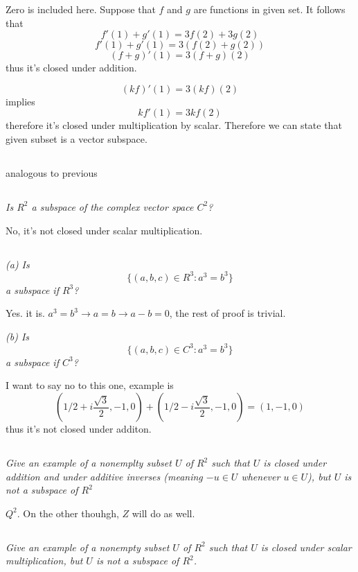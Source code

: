 \documentclass[10pt,oneside,titlepage]{book}
\begin{document}
Zero is included here. Suppose that $f$ and $g$ are functions in given set.
It follows that
$$f'(1) + g'(1) = 3f(2) + 3g(2)$$
$$f'(1) + g'(1) = 3(f(2) + g(2))$$
$$(f + g)'(1) = 3(f + g)(2)$$
thus it's closed under addition.

$$(kf)'(1) = 3(kf)(2)$$
implies
$$kf'(1) = 3kf(2)$$
therefore it's closed under multiplication by scalar.
Therefore we can state that given subset is a vector subspace.

\subsection{}
analogous to previous

\subsection{}
\textit{Is $R^2$ a subspace of the complex vector space $C^2$?}

No, it's not closed under scalar multiplication.

\subsection{}
\textit{(a) Is }
$$\{(a, b, c) \in R^3: a^3 = b^3\}$$
\textit{a subspace if $R^3$?}

Yes. it is. $a^3 = b^3 \to a = b \to a - b = 0$, the rest of proof is trivial.

\textit{(b) Is }
$$\{(a, b, c) \in C^3: a^3 = b^3\}$$
\textit{a subspace if $C^3$?}

I want to say no to this one, example is
$$(1/2 + i\frac{\sqrt{3}}{2}, -1, 0) +
(1/2 - i\frac{\sqrt{3}}{2}, -1, 0) =
(1, -1, 0)$$
thus it's not closed under additon.

\subsection{}
\textit{Give an example of a nonemplty subset $U$ of $R^2$ such that $U$ is
  closed under addition and under additive inverses (meaning $-u \in U$
  whenever $u \in U$), but $U$ is not a subspace of $R^2$}

$Q^2$. On the other thouhgh, $Z$ will do as well.

\subsection{}
\textit{Give an example of a nonempty subset $U$ of $R^2$ such that $U$ is
  closed under scalar multiplication, but $U$ is not a subspace of $R^2$.}
\end{document}
